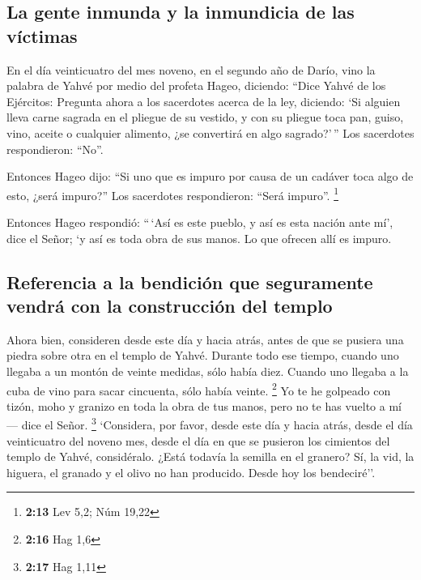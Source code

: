 \hypertarget{la-gente-inmunda-y-la-inmundicia-de-las-vuxedctimas}{%
\subsection{La gente inmunda y la inmundicia de las
víctimas}\label{la-gente-inmunda-y-la-inmundicia-de-las-vuxedctimas}}

 En el día veinticuatro del mes noveno, en el segundo año
de Darío, vino la palabra de Yahvé por medio del profeta Hageo,
diciendo:  ``Dice Yahvé de los Ejércitos: Pregunta ahora
a los sacerdotes acerca de la ley, diciendo:  `Si alguien
lleva carne sagrada en el pliegue de su vestido, y con su pliegue toca
pan, guiso, vino, aceite o cualquier alimento, ¿se convertirá en algo
sagrado?'\,'' Los sacerdotes respondieron: ``No''.

 Entonces Hageo dijo: ``Si uno que es impuro por causa de
un cadáver toca algo de esto, ¿será impuro?'' Los sacerdotes
respondieron: ``Será impuro''. \footnote{\textbf{2:13} Lev 5,2; Núm
  19,22}

 Entonces Hageo respondió: ``\,`Así es este pueblo, y así
es esta nación ante mí', dice el Señor; `y así es toda obra de sus
manos. Lo que ofrecen allí es impuro.

\hypertarget{referencia-a-la-bendiciuxf3n-que-seguramente-vendruxe1-con-la-construcciuxf3n-del-templo}{%
\subsection{Referencia a la bendición que seguramente vendrá con la
construcción del
templo}\label{referencia-a-la-bendiciuxf3n-que-seguramente-vendruxe1-con-la-construcciuxf3n-del-templo}}

 Ahora bien, consideren desde este día y hacia atrás,
antes de que se pusiera una piedra sobre otra en el templo de Yahvé.
 Durante todo ese tiempo, cuando uno llegaba a un montón
de veinte medidas, sólo había diez. Cuando uno llegaba a la cuba de vino
para sacar cincuenta, sólo había veinte. \footnote{\textbf{2:16} Hag 1,6}
 Yo te he golpeado con tizón, moho y granizo en toda la
obra de tus manos, pero no te has vuelto a mí --- dice el Señor.
\footnote{\textbf{2:17} Hag 1,11}  `Considera, por favor,
desde este día y hacia atrás, desde el día veinticuatro del noveno mes,
desde el día en que se pusieron los cimientos del templo de Yahvé,
considéralo.  ¿Está todavía la semilla en el granero? Sí,
la vid, la higuera, el granado y el olivo no han producido. Desde hoy
los bendeciré''.

